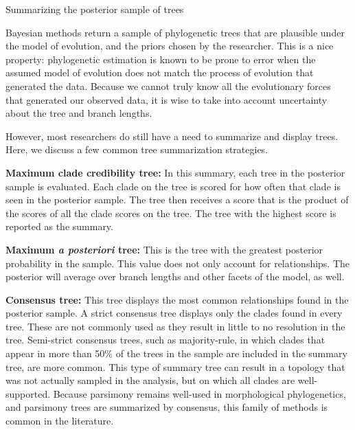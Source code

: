 \begin{boxedtext}{Summarizing the posterior sample of trees}


Bayesian methods return a sample of phylogenetic trees that are plausible under the model of evolution, and the priors chosen by the researcher. 
This is a nice property: phylogenetic estimation is known to be prone to error when the assumed model of evolution does not match the process of evolution that generated the data.
Because we cannot truly know all the evolutionary forces that generated our observed data, it is wise to take into account uncertainty about the tree and branch lengths.

However, most researchers do still have a need to summarize and display trees. 
Here, we discuss a few common tree summarization strategies.  

\textbf{Maximum clade credibility tree:} In this summary, each tree in the posterior sample is evaluated.
Each clade on the tree is scored for how often that clade is seen in the posterior sample.
The tree then receives a score that is the product of the scores of all the clade scores on the tree.
The tree with the highest score is reported as the summary. 

\textbf{Maximum \textit{a posteriori} tree:} This is the tree with the greatest posterior probability in the sample.
This value does not only account for relationships. 
The posterior will average over branch lengths and other facets of the model, as well.

\textbf{Consensus tree:} This tree displays the most common relationships found in the posterior sample. 
A strict consensus tree displays only the clades found in every tree.
These are not commonly used as they result in little to no resolution in the tree.
Semi-strict consensus trees, such as majority-rule, in which clades that appear in more than 50\% of the trees in the sample are included in the summary tree, are more common. 
This type of summary tree can result in a topology that was not actually sampled in the analysis, but on which all clades are well-supported. 
Because parsimony remains well-used in morphological phylogenetics, and parsimony trees are summarized by consensus, this family of methods is common in the literature.



\end{boxedtext}